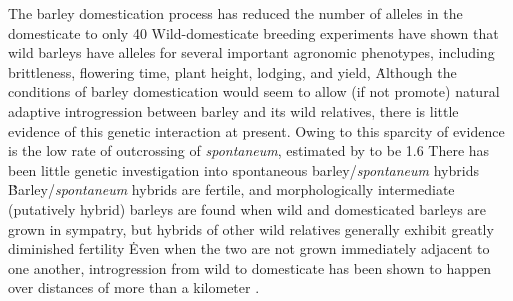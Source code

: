 \documentclass[11pt]{article}
\begin{document}
The barley domestication process has reduced the number of alleles in the domesticate to only 40%
Wild-domesticate breeding experiments have shown that wild barleys have alleles for several important agronomic phenotypes, including brittleness, flowering time, plant height, lodging, and yield,  \cite{von2006ab, handley1994chromosome}\.
Although the conditions of barley domestication would seem to allow (if not promote) natural adaptive introgression between barley and its wild relatives, there is little evidence of this genetic interaction at present.
Owing to this sparcity of evidence is the low rate of outcrossing of \emph{spontaneum}, estimated by \cite{brown1978outcrossing} to be 1.6%
There has been little genetic investigation into spontaneous barley/\emph{spontaneum} hybrids \cite{ellstrand2003dangerous}\.
Barley/\emph{spontaneum} hybrids are fertile, and morphologically intermediate (putatively hybrid) barleys are found when wild and domesticated barleys are grown in sympatry, but hybrids of other wild relatives generally exhibit greatly diminished fertility \cite{ellstrand2003dangerous, harlan1995living}\.
Even when the two are not grown immediately adjacent to one another, introgression from wild to domesticate has been shown to happen over distances of more than a kilometer \cite{hillman2001new}.




\end{document}

